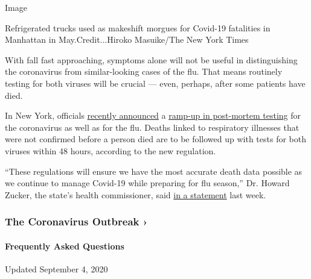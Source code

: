 Image

Refrigerated trucks used as makeshift morgues for Covid-19 fatalities in
Manhattan in May.Credit...Hiroko Masuike/The New York Times

With fall fast approaching, symptoms alone will not be useful in
distinguishing the coronavirus from similar-looking cases of the flu.
That means routinely testing for both viruses will be crucial --- even,
perhaps, after some patients have died.

In New York, officials
\href{https://health.ny.gov/press/releases/2020/2020-08-31_postmortem_covid19_influenza_testing.htm}{recently
announced} a
\href{https://regs.health.ny.gov/sites/default/files/pdf/emergency_regulations/Confirmatory-testing-regs-FINAL.pdf}{ramp-up
in post-mortem testing} for the coronavirus as well as for the flu.
Deaths linked to respiratory illnesses that were not confirmed before a
person died are to be followed up with tests for both viruses within 48
hours, according to the new regulation.

``These regulations will ensure we have the most accurate death data
possible as we continue to manage Covid-19 while preparing for flu
season,'' Dr. Howard Zucker, the state's health commissioner, said
\href{https://health.ny.gov/press/releases/2020/2020-08-31_postmortem_covid19_influenza_testing.htm}{in
a statement} last week.

\href{https://www.nytimes3xbfgragh.onion/news-event/coronavirus?action=click\&pgtype=Article\&state=default\&region=MAIN_CONTENT_3\&context=storylines_faq}{}

\hypertarget{the-coronavirus-outbreak-}{%
\subsubsection{The Coronavirus Outbreak
›}\label{the-coronavirus-outbreak-}}

\hypertarget{frequently-asked-questions}{%
\paragraph{Frequently Asked
Questions}\label{frequently-asked-questions}}

Updated September 4, 2020

